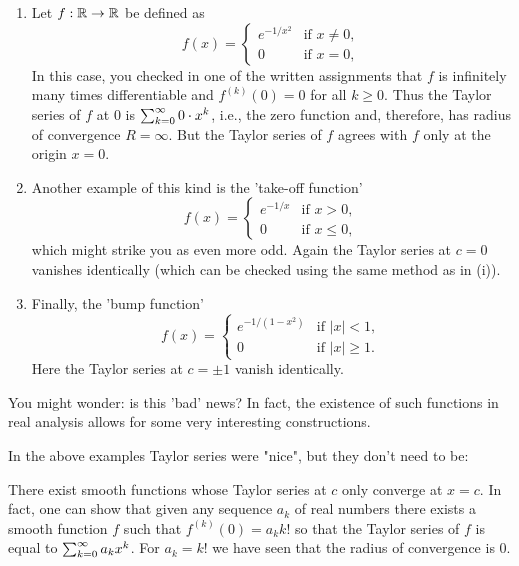 \documentclass[10pt, a4paper]{article}
\begin{document}
\begin{enumerate}[label = (\roman*)]
    \item Let $f : \mathbb{R} \rightarrow \mathbb{R}$ be defined as
    \[
    f(x) = \begin{cases}
        e ^ {-1 / x ^ 2} & \text{if }x \neq 0, \\
        0 & \text{if }x = 0,
    \end{cases}
    \]
    In this case,
    you checked in one of the written assignments that $f$ is infinitely many times differentiable and $f ^ {(k)}(0) = 0$ for all $k \geq 0$.
    Thus the Taylor series of $f$ at $0$ is $\sum_{k = 0}^{\infty} 0 \cdot x ^ k$,
    i.e.,
    the zero function and,
    therefore,
    has radius of convergence $R = \infty$.
    But the Taylor series of $f$ agrees with $f$ only at the origin $x = 0$.

    \item Another example of this kind is the 'take-off function'
    \[
    f(x) = \begin{cases}
        e ^ {-1 / x} & \text{if }x > 0, \\
        0 & \text{if }x \leq 0,
    \end{cases}
    \]
    which might strike you as even more odd.
    Again the Taylor series at $c = 0$ vanishes identically
    (which can be checked using the same method as in (i)).

    \item Finally,
    the 'bump function'
    \[
    f(x) = \begin{cases}
        e ^ {-1 / (1 - x ^ 2)} & \text{if } |x| < 1, \\
        0 & \text{if } |x| \geq 1.
    \end{cases}
    \]
    Here the Taylor series at $c = \pm 1$ vanish identically.
\end{enumerate}

\begin{remark}
    You might wonder:
    is this 'bad' news?
    In fact,
    the existence of such functions in real analysis allows for some very interesting constructions.
\end{remark}

In the above examples Taylor series were "nice",
but they don't need to be:

\begin{example}
    There exist smooth functions whose Taylor series at $c$ only converge at $x = c$.
    In fact,
    one can show that given any sequence $a_k$ of real numbers there exists a smooth function $f$ such that $f ^ {(k)}(0) = a_kk!$ so that the Taylor series of $f$ is equal to $\sum_{k = 0}^{\infty} a_kx ^ k$.
    For $a_k = k!$ we have seen that the radius of convergence is $0$.
\end{example}
\end{document}

